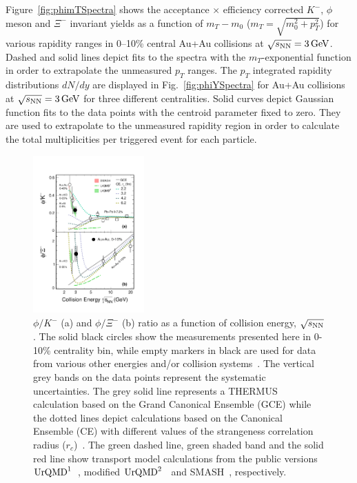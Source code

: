 \documentclass[%
 reprint,	
showpacs,
 amsmath,amssymb,
 aps,
 superscriptaddress,
]{revtex4-1}
\begin{document}
Figure~\ref{fig:phimTSpectra} shows the acceptance $\times$ efficiency corrected $K^-$, $\phi$ meson and $\Xi^-$ invariant yields as a function of $m_T-m_0$ ($m_T = \sqrt{m_{0}^{2}+p_{T}^2}$) for various rapidity ranges in 0--10\% central Au+Au collisions at ${\sqrt{s_{\rm NN}} = \rm{3\,GeV}}$. %
Dashed and solid lines depict fits to the spectra with the $m_T$-exponential function in order to extrapolate the unmeasured $p_T$ ranges. 
The $p_T$ integrated rapidity distributions $dN/dy$ are displayed in Fig.~\ref{fig:phiYSpectra} for Au+Au collisions at ${\sqrt{s_{\rm NN}} = \rm{3\,GeV}}$ for three different centralities. %
Solid curves depict Gaussian function fits to the data points with the centroid parameter fixed to zero. They are used to extrapolate to the unmeasured rapidity region in order to calculate the total multiplicities per triggered event for each particle.


\begin{figure}
\centering
\hspace*{-4mm}
\includegraphics[width=0.38\textwidth]{fig4_phi_over_kminus_zoomin.eps}
  \caption{$\phi/K^-$ (a) and $\phi/\Xi^-$ (b) ratio as a function of collision energy, $\sqrt{s_{\rm NN}}$. The solid black circles show the measurements presented here in 0-10\% centrality bin, while empty markers in black are used for data from various other energies and/or collision systems~\cite{E917_phi,NA49_phi,FOPI_phi_AlAl,FOPI_phi_NiNi,HADES_phi_ArKCl,HADES_phi_AuAu,Xi_ArKCl_HADES,star_bes_strangeness}. The vertical grey bands on the data points represent the systematic uncertainties. The grey solid line represents a THERMUS calculation based on the Grand Canonical Ensemble (GCE) while the dotted lines depict calculations based on the Canonical Ensemble (CE) with different values of the strangeness correlation radius ($r_c$)~\cite{THERMUS_WHEATON200984,Andronic_2018Naure}. The green dashed line, green shaded band and the solid red line show transport model calculations from the public versions $\textup{UrQMD}^{1}$~\cite{urQMD,UrQMD_2}, modified $\textup{UrQMD}^{2}$~\cite{Steinheimer_2015_UrQMD} and SMASH~\cite{Elfner_SMASH}, respectively.}
\label{fig:phi2Kratio} 
\end{figure}
\end{document}
